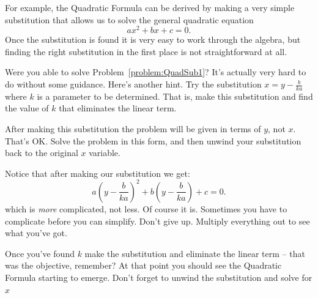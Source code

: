 For example,  the Quadratic Formula can be derived by making a very
simple substitution that allows us to solve the general quadratic equation
  \begin{equation}
    ax^2+bx+c=0.\label{eq:QuadEq}
  \end{equation}
  Once the substitution is found it is very easy to work through the
  algebra, but finding the right substitution in the first place is
  not straightforward at all.



\begin{embeddedproblem}
  Were you able to solve Problem~\ref{problem:QuadSub1}?
  It's actually very hard to do without some guidance. Here's another
  hint. Try the substitution $x=y-\frac{b}{ka}$ where $k$ is a
  parameter to be determined.  That is, make this substitution and
  find the value of $k$ that eliminates the linear term.

  After making this substitution the problem will be given in terms of
  $y$, not $x$. That's OK. Solve the problem in this form, and then
  unwind your substitution back to the original $x$ variable.
\end{embeddedproblem}

  Notice that after making our substitution we
  get:
    $$ a\left(y-\frac{b}{k a}\right)^2+b\left(y-\frac{b}{k
        a}\right)+c=0.  $$ which is \emph{more} complicated, not
    less. Of course it is. Sometimes you have to complicate before you
    can simplify.  Don't give up. Multiply everything out to see what
    you've got.

  Once you've found $k$ make the substitution and eliminate the linear
  term -- that was the objective, remember? At that point you should
  see the Quadratic Formula starting to emerge.  Don't forget to
  unwind the substitution and solve for $x$

